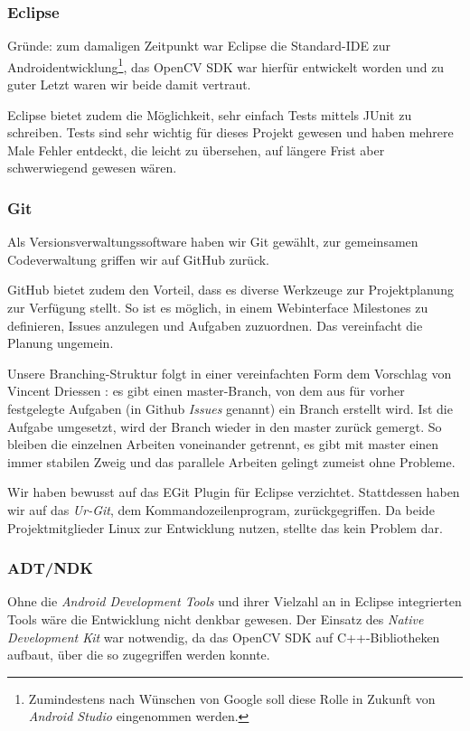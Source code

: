 \subsubsection{Eclipse}  %


Gründe: zum damaligen Zeitpunkt war Eclipse die Standard-IDE zur
Androidentwicklung\footnote{Zumindestens nach Wünschen von Google soll diese
Rolle in Zukunft von \emph{Android Studio} eingenommen werden.}, das OpenCV SDK
war hierfür entwickelt worden und zu guter Letzt waren wir beide damit vertraut.

Eclipse bietet zudem die Möglichkeit, sehr einfach Tests mittels JUnit zu
schreiben. Tests sind sehr wichtig für dieses Projekt gewesen und haben mehrere
Male Fehler entdeckt, die leicht zu übersehen, auf längere Frist aber
schwerwiegend gewesen wären.

\subsubsection{Git}  %

Als Versionsverwaltungssoftware haben wir Git gewählt, zur gemeinsamen
Codeverwaltung griffen wir auf GitHub zurück.

GitHub bietet zudem den Vorteil, dass es diverse Werkzeuge zur Projektplanung zur
Verfügung stellt. So ist es möglich, in einem Webinterface Milestones zu
definieren, Issues anzulegen und Aufgaben zuzuordnen. Das vereinfacht die
Planung ungemein.

Unsere Branching-Struktur folgt in einer vereinfachten Form dem Vorschlag von
Vincent Driessen \citep{git:driessen}: es gibt einen master-Branch, von dem aus
für vorher festgelegte Aufgaben (in Github \emph{Issues} genannt) ein Branch
erstellt wird. Ist die Aufgabe umgesetzt, wird der Branch wieder in den master
zurück gemergt. So bleiben die einzelnen Arbeiten voneinander getrennt, es gibt
mit master einen immer stabilen Zweig und das parallele Arbeiten gelingt zumeist
ohne Probleme.

Wir haben bewusst auf das EGit Plugin für Eclipse verzichtet. Stattdessen haben
wir auf das \emph{Ur-Git}, dem Kommandozeilenprogram, zurückgegriffen. Da beide
Projektmitglieder Linux zur Entwicklung nutzen, stellte das kein Problem dar.

\subsubsection{ADT/NDK}  %

Ohne die \emph{Android Development Tools} und ihrer Vielzahl an in Eclipse
integrierten Tools wäre die Entwicklung nicht denkbar gewesen. Der Einsatz des
\emph{Native Development Kit} war notwendig, da das OpenCV SDK auf
C++-Bibliotheken aufbaut, über die so zugegriffen werden konnte.

